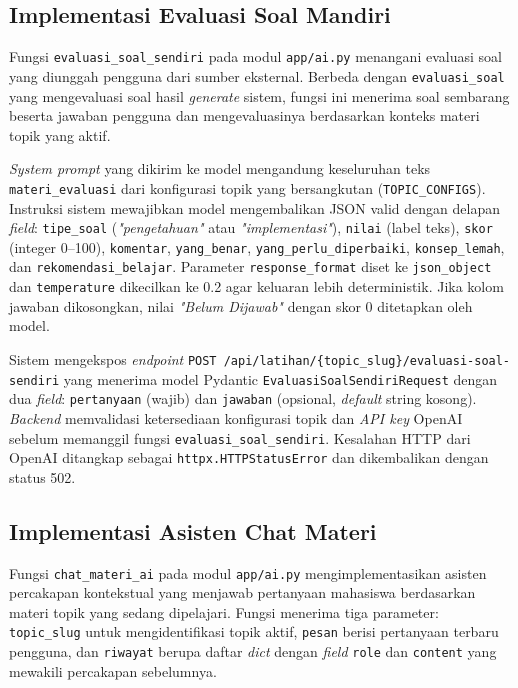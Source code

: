 \subsection{Implementasi Evaluasi Soal Mandiri}

Fungsi \texttt{evaluasi\_soal\_sendiri} pada modul \texttt{app/ai.py} menangani evaluasi soal yang diunggah pengguna dari sumber eksternal. Berbeda dengan \texttt{evaluasi\_soal} yang mengevaluasi soal hasil \textit{generate} sistem, fungsi ini menerima soal sembarang beserta jawaban pengguna dan mengevaluasinya berdasarkan konteks materi topik yang aktif.

\textit{System prompt} yang dikirim ke model mengandung keseluruhan teks \texttt{materi\_evaluasi} dari konfigurasi topik yang bersangkutan (\texttt{TOPIC\_CONFIGS}). Instruksi sistem mewajibkan model mengembalikan JSON valid dengan delapan \textit{field}: \texttt{tipe\_soal} (\textit{"pengetahuan"} atau \textit{"implementasi"}), \texttt{nilai} (label teks), \texttt{skor} (integer 0--100), \texttt{komentar}, \texttt{yang\_benar}, \texttt{yang\_perlu\_diperbaiki}, \texttt{konsep\_lemah}, dan \texttt{rekomendasi\_belajar}. Parameter \texttt{response\_format} diset ke \texttt{json\_object} dan \texttt{temperature} dikecilkan ke 0.2 agar keluaran lebih deterministik. Jika kolom jawaban dikosongkan, nilai \textit{"Belum Dijawab"} dengan skor 0 ditetapkan oleh model.

\begin{sloppypar}
Sistem mengekspos \textit{endpoint} \texttt{POST /api/latihan/\allowbreak{}\{topic\_slug\}/\allowbreak{}evaluasi-soal-sendiri} yang menerima model Pydantic \texttt{EvaluasiSoalSendiriRequest} dengan dua \textit{field}: \texttt{pertanyaan} (wajib) dan \texttt{jawaban} (opsional, \textit{default} string kosong). \textit{Backend} memvalidasi ketersediaan konfigurasi topik dan \textit{API key} OpenAI sebelum memanggil fungsi \texttt{evaluasi\_soal\_sendiri}. Kesalahan HTTP dari OpenAI ditangkap sebagai \texttt{httpx.HTTPStatusError} dan dikembalikan dengan status 502.
\end{sloppypar}

\subsection{Implementasi Asisten Chat Materi}

Fungsi \texttt{chat\_materi\_ai} pada modul \texttt{app/ai.py} mengimplementasikan asisten percakapan kontekstual yang menjawab pertanyaan mahasiswa berdasarkan materi topik yang sedang dipelajari. Fungsi menerima tiga parameter: \texttt{topic\_slug} untuk mengidentifikasi topik aktif, \texttt{pesan} berisi pertanyaan terbaru pengguna, dan \texttt{riwayat} berupa daftar \textit{dict} dengan \textit{field} \texttt{role} dan \texttt{content} yang mewakili percakapan sebelumnya.


